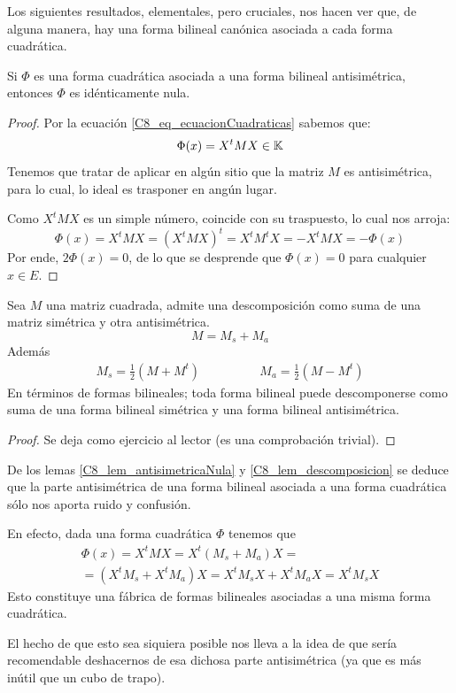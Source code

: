 Los siguientes resultados, elementales, pero cruciales, nos hacen ver que, de alguna manera, hay una forma bilineal canónica asociada a cada forma cuadrática. 
\begin{lem}
	\label{C8_lem_antisimetricaNula}
	Si $\Phi$ es una forma cuadrática asociada a una forma bilineal antisimétrica, entonces $\Phi$ es idénticamente nula.
\end{lem}
\begin{proof}
	Por la ecuación \eqref{C8_eq_ecuacionCuadraticas} sabemos que:
	\[\Phi(x)=X^tMX\in\mathbb{K}\]
	Tenemos que tratar de aplicar en algún sitio que la matriz $M$ es antisimétrica, para lo cual, lo ideal es trasponer en angún lugar.
	
	Como $X^tMX$ es un simple número, coincide con su traspuesto, lo cual nos arroja:
	\[\Phi(x)=X^tMX=(X^tMX)^t=X^tM^tX=-X^tMX=-\Phi(x)\]
	Por ende, $2\Phi(x)=0$, de lo que se desprende que $\Phi(x)=0$ para cualquier $x\in E$.
\end{proof}
\begin{lem}
	\label{C8_lem_descomposicion}
	Sea $M$ una matriz cuadrada, admite una descomposición como suma de una matriz simétrica y otra antisimétrica.
	\[M= M_s+M_a\]
	Además
	\[\begin{array}{cc}
	M_s=\frac{1}{2}(M+M^t)\qquad &\qquad M_a=\frac{1}{2}(M-M^t)
	\end{array}\]
	En términos de formas bilineales; toda forma bilineal puede descomponerse como suma de una forma bilineal simétrica y una forma bilineal antisimétrica.
\end{lem}
\begin{proof}
	Se deja como ejercicio al lector (es una comprobación trivial).
\end{proof}
\begin{obs}
	De los lemas \ref{C8_lem_antisimetricaNula} y \ref{C8_lem_descomposicion} se deduce que la parte antisimétrica de una forma bilineal asociada a una forma cuadrática sólo nos aporta ruido y confusión.
	
	En efecto, dada una forma cuadrática $\Phi$ tenemos que
	\begin{multline}\Phi(x)=X^tMX=X^t(M_s+M_a)X=\\=(X^tM_s+X^tM_a)X=X^tM_sX+X^tM_aX=X^tM_sX\end{multline}
	Esto constituye una fábrica de formas bilineales asociadas a una misma forma cuadrática.
	
	El hecho de que esto sea siquiera posible nos lleva a la idea de que sería recomendable deshacernos de esa dichosa parte antisimétrica (ya que es más inútil que un cubo de trapo).
\end{obs}

